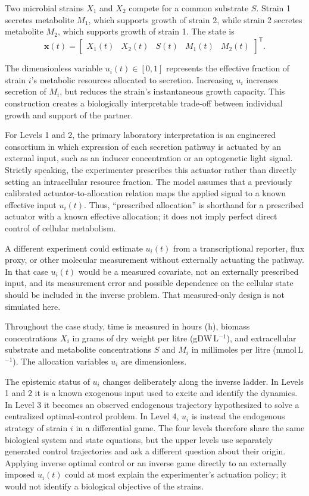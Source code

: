 \documentclass[11pt,a4paper]{article}
\newcommand{\vect}[1]{\boldsymbol{#1}}
\begin{document}
Two microbial strains \(X_1\) and \(X_2\) compete for a common substrate \(S\).
Strain 1 secretes metabolite \(M_1\), which supports growth of strain 2, while
strain 2 secretes metabolite \(M_2\), which supports growth of strain 1. The
state is
\begin{equation}
  \vect{x}(t)=
  \begin{bmatrix}
    X_1(t) & X_2(t) & S(t) & M_1(t) & M_2(t)
  \end{bmatrix}^{\mathsf T}.
\end{equation}

The dimensionless variable \(u_i(t)\in[0,1]\) represents the effective
fraction of strain \(i\)'s metabolic resources allocated to secretion.
Increasing \(u_i\) increases secretion of \(M_i\), but reduces the strain's
instantaneous growth capacity. This construction creates a biologically
interpretable trade-off between individual growth and support of the partner.

For Levels 1 and 2, the primary laboratory interpretation is an engineered
consortium in which expression of each secretion pathway is actuated by an
external input, such as an inducer concentration or an optogenetic light
signal. Strictly speaking, the experimenter prescribes this actuator rather
than directly setting an intracellular resource fraction. The model assumes
that a previously calibrated actuator-to-allocation relation maps the applied
signal to a known effective input \(u_i(t)\). Thus, ``prescribed allocation''
is shorthand for a prescribed actuator with a known effective allocation; it
does not imply perfect direct control of cellular metabolism.

A different experiment could estimate \(u_i(t)\) from a transcriptional
reporter, flux proxy, or other molecular measurement without externally
actuating the pathway. In that case \(u_i(t)\) would be a measured covariate,
not an externally prescribed input, and its measurement error and possible
dependence on the cellular state should be included in the inverse problem.
That measured-only design is not simulated here.

Throughout the case study, time is measured in hours (h), biomass
concentrations \(X_i\) in grams of dry weight per litre (gDW\,L\(^{-1}\)),
and extracellular substrate and metabolite concentrations \(S\) and \(M_i\)
in millimoles per litre (mmol\,L\(^{-1}\)). The allocation variables \(u_i\)
are dimensionless.

The epistemic status of \(u_i\) changes deliberately along the inverse
ladder. In Levels 1 and 2 it is a known exogenous input used to excite and
identify the dynamics. In Level 3 it becomes an observed endogenous
trajectory hypothesized to solve a centralized optimal-control problem. In
Level 4, \(u_i\) is instead the endogenous strategy of strain \(i\) in a
differential game. The four levels therefore share the same biological
system and state equations, but the upper levels use separately generated
control trajectories and ask a different question about their origin.
Applying inverse optimal control or an inverse game directly to an externally
imposed \(u_i(t)\) could at most explain the experimenter's actuation policy;
it would not identify a biological objective of the strains.
\end{document}
